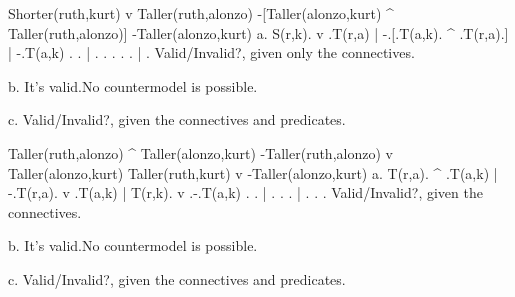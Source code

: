 	\endanswerlist

\argument
 Shorter(ruth,kurt) v Taller(ruth,alonzo)
 -[Taller(alonzo,kurt) ^ Taller(ruth,alonzo)]
\argumentline
 -Taller(alonzo,kurt)
\endargument
	\answerlist
	a.
	\truthtable
	 S(r,k). v .T(r,a) | -.[.T(a,k). ^ .T(r,a).] | -.T(a,k)
	\truthtableline
	       .   .       |  . .      .   .      .  |  .
	\endtruthtable
	Valid/Invalid?, given only the connectives.

	b. It's valid.\OR No countermodel is possible.\OR
	\heightmodel
	 
	\endheightmodel

	c. Valid/Invalid?, given the connectives and predicates.
	\endanswerlist

\argument
 Taller(ruth,alonzo) ^ Taller(alonzo,kurt)
 -Taller(ruth,alonzo) v Taller(alonzo,kurt)
\argumentline
 Taller(ruth,kurt) v -Taller(alonzo,kurt) 
\endargument
	\answerlist
	a.
	\truthtable
	 T(r,a). ^ .T(a,k) | -.T(r,a). v .T(a,k) | T(r,k). v .-.T(a,k)
	\truthtableline
	       .   .       |  .      .   .       |       .   . .
	\endtruthtable
	Valid/Invalid?, given the connectives.

	b. It's valid.\OR No countermodel is possible.\OR
	\heightmodel
	 
	\endheightmodel

	c. Valid/Invalid?, given the connectives and predicates.
	\endanswerlist

\endproblems
\bye
